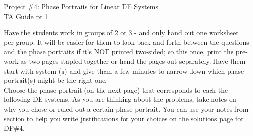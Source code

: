 \documentclass[epsf]{article}
\begin{document}
\newcommand{\R}{\mathbb{R}}
\newcommand{\noi}{\noindent}
\newcommand{\bs}{\bigskip}


\begin{center}
{\Large Project \#4: Phase Portraits for Linear DE Systems\\
\vskip 2mm
TA Guide pt 1}
\end{center}

\noi{\bf 1.} Have the students work in groups of 2 or 3 - and only hand out one worksheet per group.  It will be easier for them to look back and forth between the questions and the phase portraits if it's NOT printed two-sided; so this once, print the pre-work as two pages stapled together or hand the pages out separately.   Have them start with system (a) and give them a few minutes to narrow down which phase portrait(s) might be the right one.\\



\noi{\bf PW 1} Choose the phase portrait (on the next page) that corresponds to each the following DE systems.  As you are thinking about the problems, take notes on why you chose or ruled out a certain phase portrait.  You can use your notes from section to help you write justifications for your choices on the solutions page for DP\#4.
\end{document}
